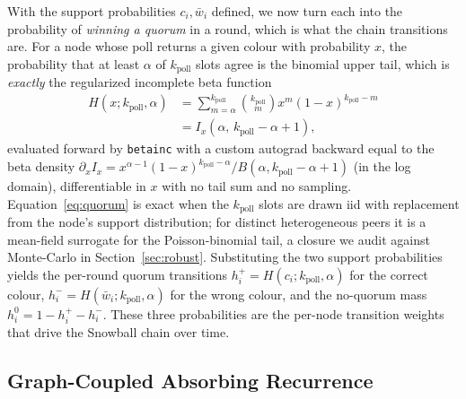 \documentclass[journal]{IEEEtran}
\newcommand{\kpoll}{\ensuremath{k_{\mathrm{poll}}}}      %
\begin{document}
With the support probabilities $c_i,\bar w_i$ defined, we now turn each into the
probability of \emph{winning a quorum} in a round, which is what the chain
transitions are. For a node whose poll returns a given colour with probability
$x$, the probability that at least $\alpha$ of $\kpoll$ slots agree is the
binomial upper tail, which is \emph{exactly} the regularized incomplete beta
function
\begin{equation}
  \begin{aligned}
    H(x;\kpoll,\alpha)
    &=\sum_{m=\alpha}^{\kpoll}\binom{\kpoll}{m}x^m(1-x)^{\kpoll-m} \\
    &=I_x\!\left(\alpha,\,\kpoll-\alpha+1\right),
  \end{aligned}
  \label{eq:quorum}
\end{equation}
evaluated forward by \texttt{betainc}
\cite{PLACEHOLDER_scipy,PLACEHOLDER_incomplete_beta} with a custom autograd
backward equal to the beta density
$\partial_x I_x=x^{\alpha-1}(1-x)^{\kpoll-\alpha}/B(\alpha,\kpoll-\alpha+1)$ (in
the log domain), differentiable in $x$ with no tail sum and no sampling.
Equation~\eqref{eq:quorum} is exact when the $\kpoll$ slots are drawn iid with
replacement from the node's support distribution; for distinct heterogeneous
peers it is a mean-field surrogate for the Poisson-binomial tail, a closure we
audit against Monte-Carlo in Section~\ref{sec:robust}. Substituting the two
support probabilities yields the per-round quorum transitions
$h^+_i=H(c_i;\kpoll,\alpha)$ for the correct colour,
$h^-_i=H(\bar w_i;\kpoll,\alpha)$ for the wrong colour, and the no-quorum mass
$h^0_i=1-h^+_i-h^-_i$. These three probabilities are the per-node transition
weights that drive the Snowball chain over time.

\subsection{Graph-Coupled Absorbing Recurrence}\label{sub:chain}
\end{document}
